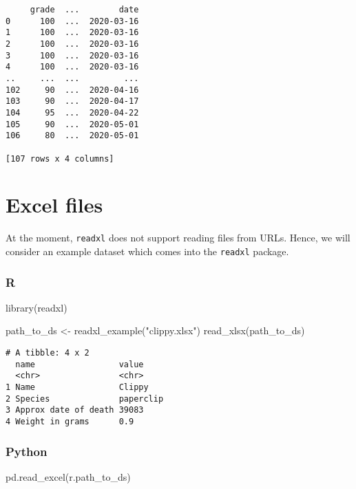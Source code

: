 \documentclass[
  letterpaper,
  DIV=11,
  numbers=noendperiod]{scrreprt}
\newenvironment{Shaded}{\begin{snugshade}}{\end{snugshade}}
\newcommand{\FunctionTok}[1]{\textcolor[rgb]{0.28,0.35,0.67}{#1}}
\newcommand{\NormalTok}[1]{\textcolor[rgb]{0.00,0.46,0.62}{#1}}
\newcommand{\OtherTok}[1]{\textcolor[rgb]{0.00,0.46,0.62}{#1}}
\newcommand{\StringTok}[1]{\textcolor[rgb]{0.13,0.47,0.30}{#1}}
\begin{document}
\begin{verbatim}
     grade  ...        date
0      100  ...  2020-03-16
1      100  ...  2020-03-16
2      100  ...  2020-03-16
3      100  ...  2020-03-16
4      100  ...  2020-03-16
..     ...  ...         ...
102     90  ...  2020-04-16
103     90  ...  2020-04-17
104     95  ...  2020-04-22
105     90  ...  2020-05-01
106     80  ...  2020-05-01

[107 rows x 4 columns]
\end{verbatim}

\hypertarget{excel-files}{%
\section{Excel files}\label{excel-files}}

At the moment, \texttt{readxl} does not support reading files from URLs.
Hence, we will consider an example dataset which comes into the
\texttt{readxl} package.

\hypertarget{r-4}{%
\subsubsection{R}\label{r-4}}

\begin{Shaded}
\begin{Highlighting}[]
\FunctionTok{library}\NormalTok{(readxl)}

\NormalTok{path\_to\_ds }\OtherTok{\textless{}{-}} \FunctionTok{readxl\_example}\NormalTok{(}\StringTok{"clippy.xlsx"}\NormalTok{)}
\FunctionTok{read\_xlsx}\NormalTok{(path\_to\_ds)}
\end{Highlighting}
\end{Shaded}

\begin{verbatim}
# A tibble: 4 x 2
  name                 value    
  <chr>                <chr>    
1 Name                 Clippy   
2 Species              paperclip
3 Approx date of death 39083    
4 Weight in grams      0.9      
\end{verbatim}

\hypertarget{python-4}{%
\subsubsection{Python}\label{python-4}}

\begin{Shaded}
\begin{Highlighting}[]
\NormalTok{pd.read\_excel(r.path\_to\_ds)}
\end{Highlighting}
\end{Shaded}
\end{document}
